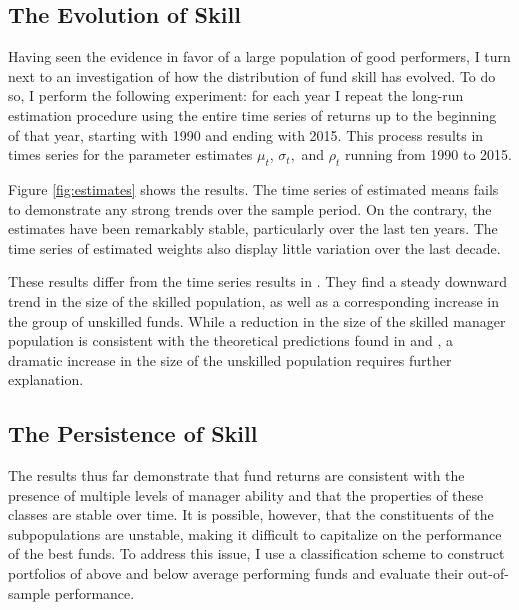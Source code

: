 	\subsection{The Evolution of Skill}
		Having seen the evidence in favor of a large population of good performers, I turn next to an investigation of how the distribution of fund skill has evolved. To do so, I perform the following experiment: for each year I repeat the long-run estimation procedure using the entire time series of returns up to the beginning of that year, starting with 1990 and ending with 2015. This process results in times series for the parameter estimates $\mu_t$, $\sigma_t,$ and $\rho_t$ running from 1990 to 2015.

		Figure \ref{fig:estimates} shows the results. The time series of estimated means fails to demonstrate any strong trends over the sample period. On the contrary, the estimates have been remarkably stable, particularly over the last ten years. The time series of estimated weights also display little variation over the last decade.

		These results differ from the time series results in \citet{Barras2010}.  They find a steady downward trend in the size of the skilled population, as well as a corresponding increase in the group of unskilled funds.  While a reduction in the size of the skilled manager population is consistent with the theoretical predictions found in \citet{Berk2004} and \citet{Pastor2012}, a dramatic increase in the size of the unskilled population requires further explanation.

	\subsection{The Persistence of Skill}
		The results thus far demonstrate that fund returns are consistent with the presence of multiple levels of manager ability and that the properties of these classes are stable over time. It is possible, however, that the constituents of the subpopulations are unstable, making it difficult to capitalize on the performance of the best funds. To address this issue, I use a classification scheme to construct portfolios of above and below average performing funds and evaluate their out-of-sample performance.

